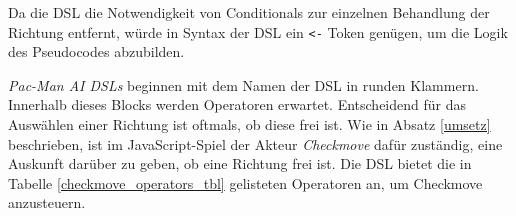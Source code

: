 \documentclass[conference]{IEEEtran}
\begin{document}
Da die DSL die Notwendigkeit von Conditionals zur einzelnen Behandlung der Richtung entfernt, würde in Syntax der DSL ein \texttt{<-} Token genügen, um  die Logik des Pseudocodes abzubilden.

\emph{Pac-Man AI DSLs} beginnen mit dem Namen der DSL in runden Klammern. Innerhalb dieses Blocks werden Operatoren erwartet. Entscheidend für das Auswählen einer Richtung ist oftmals, ob diese frei ist. Wie in Absatz \ref{umsetz} beschrieben, ist im JavaScript-Spiel der Akteur \emph{Checkmove} dafür zuständig, eine Auskunft darüber zu geben, ob eine Richtung frei ist. Die DSL bietet die in Tabelle \ref{checkmove_operators_tbl} gelisteten Operatoren an, um Checkmove anzusteuern.

\lstset{
  breaklines=true
  }
\end{document}
